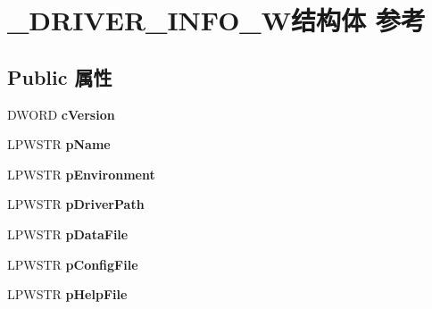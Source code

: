 \hypertarget{struct___d_r_i_v_e_r___i_n_f_o__6_w}{}\section{\+\_\+\+D\+R\+I\+V\+E\+R\+\_\+\+I\+N\+F\+O\+\_\+W结构体 参考}
\label{struct___d_r_i_v_e_r___i_n_f_o__6_w}
\subsection*{Public 属性}
\begin{DoxyCompactItemize}
\item 
\mbox{\label{struct___d_r_i_v_e_r___i_n_f_o__6_w_a7f08b3e170f2dbf32416ec83033382d3}} 
D\+W\+O\+RD {\bfseries c\+Version}
\item 
\mbox{\label{struct___d_r_i_v_e_r___i_n_f_o__6_w_aad6c4ba6a0243247bf108715e3701fb8}} 
L\+P\+W\+S\+TR {\bfseries p\+Name}
\item 
\mbox{\label{struct___d_r_i_v_e_r___i_n_f_o__6_w_a152bbf71daf3d24e4f338eed899a3c0f}} 
L\+P\+W\+S\+TR {\bfseries p\+Environment}
\item 
\mbox{\label{struct___d_r_i_v_e_r___i_n_f_o__6_w_a93633efd88056c61b5078ab581beb944}} 
L\+P\+W\+S\+TR {\bfseries p\+Driver\+Path}
\item 
\mbox{\label{struct___d_r_i_v_e_r___i_n_f_o__6_w_a2e8db86a1eb8103a43ecebb13dce1bf2}} 
L\+P\+W\+S\+TR {\bfseries p\+Data\+File}
\item 
\mbox{\label{struct___d_r_i_v_e_r___i_n_f_o__6_w_a1dbec6f06def773febfed1f1c0cca591}} 
L\+P\+W\+S\+TR {\bfseries p\+Config\+File}
\item 
\mbox{\label{struct___d_r_i_v_e_r___i_n_f_o__6_w_acf66be76bbad2ea714b40674fef1e9bb}} 
L\+P\+W\+S\+TR {\bfseries p\+Help\+File}
\item 
\mbox{\label{struct___d_r_i_v_e_r___i_n_f_o__6_w_a97d041946e9090ee91522f27e807f114}} 

\end{DoxyCompactItemize}

